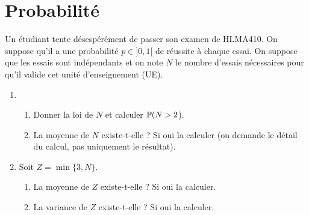 \documentclass{article}
\begin{document}
\section{Probabilité}

\exo{}
Un étudiant tente désespérément de passer son examen de HLMA410. On suppose qu'il a une probabilité $p \in]0,1[$ de réussite à chaque essai. On suppose que les essais sont indépendants et on note $N$ le nombre d'essais nécessaires pour qu'il valide cet unité d'enseignement (UE).

\begin{enumerate}
\item  
	\begin{enumerate}
		\item Donner la loi de $N$ et calculer $\P(N >2$). 
		\item La moyenne de $N$ existe-t-elle ? Si oui la calculer (on demande le détail du calcul, pas uniquement le résultat).
	\end{enumerate}
\item Soit $Z= \min\{3,N\}$.
	\begin{enumerate}
		\item La moyenne de $Z$ existe-t-elle ? Si oui la calculer.
		\item La variance de $Z$ existe-t-elle ? Si oui la calculer.\end{enumerate}
\end{enumerate}



\end{document}
